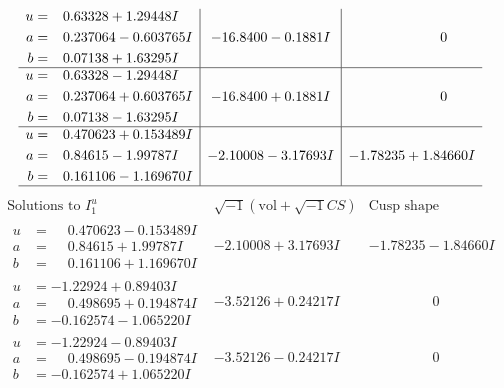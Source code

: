 \documentclass[1p]{elsarticle_modified}
\theoremstyle{definition}
\newcommand{\I}{\sqrt{-1}}
\begin{document}
$$\begin{array}{c|c|c}
\begin{aligned}
u &= \phantom{-}0.63328 + 1.29448 I \\
a &= \phantom{-}0.237064 - 0.603765 I \\
b &= \phantom{-}0.07138 + 1.63295 I\end{aligned}
 & -16.8400 - 0.1881 I & \phantom{-0.000000 } 0 \\ \hline\begin{aligned}
u &= \phantom{-}0.63328 - 1.29448 I \\
a &= \phantom{-}0.237064 + 0.603765 I \\
b &= \phantom{-}0.07138 - 1.63295 I\end{aligned}
 & -16.8400 + 0.1881 I & \phantom{-0.000000 } 0 \\ \hline\begin{aligned}
u &= \phantom{-}0.470623 + 0.153489 I \\
a &= \phantom{-}0.84615 - 1.99787 I \\
b &= \phantom{-}0.161106 - 1.169670 I\end{aligned}
 & -2.10008 - 3.17693 I & -1.78235 + 1.84660 I\\
 \hline 
 \end{array}$$\newpage$$\begin{array}{c|c|c}  
\text{Solutions to }I^u_{1}& \I (\text{vol} + \sqrt{-1}CS) & \text{Cusp shape}\\
 \hline 
\begin{aligned}
u &= \phantom{-}0.470623 - 0.153489 I \\
a &= \phantom{-}0.84615 + 1.99787 I \\
b &= \phantom{-}0.161106 + 1.169670 I\end{aligned}
 & -2.10008 + 3.17693 I & -1.78235 - 1.84660 I \\ \hline\begin{aligned}
u &= -1.22924 + 0.89403 I \\
a &= \phantom{-}0.498695 + 0.194874 I \\
b &= -0.162574 - 1.065220 I\end{aligned}
 & -3.52126 + 0.24217 I & \phantom{-0.000000 } 0 \\ \hline\begin{aligned}
u &= -1.22924 - 0.89403 I \\
a &= \phantom{-}0.498695 - 0.194874 I \\
b &= -0.162574 + 1.065220 I\end{aligned}
 & -3.52126 - 0.24217 I & \phantom{-0.000000 } 0 \\ \hline\begin{aligned}

\end{aligned}
\end{array}$$
\end{document}
